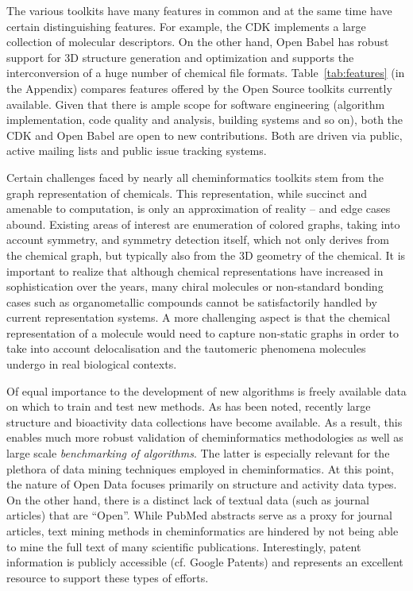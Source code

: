 \documentclass{sig-alternate}
\begin{document}
The various toolkits have many features in common and at the same time
have certain distinguishing features. For example, the CDK implements
a large collection of molecular descriptors. On the other hand, Open
Babel has robust support for 3D structure generation and optimization
and supports the interconversion of a huge number of chemical file
formats. Table~\ref{tab:features} (in the Appendix) compares features
offered by the Open Source toolkits currently available.  Given that
there is ample scope for software engineering (algorithm
implementation, code quality and analysis, building systems and so on), both
the CDK and Open Babel are open to new contributions. Both are driven
via public, active mailing lists and public issue tracking systems.

Certain challenges faced by nearly all cheminformatics toolkits stem
from the graph representation of chemicals. This representation, while
succinct and amenable to computation, is only an approximation of
reality -- and edge cases abound. Existing areas of interest are
enumeration of colored graphs, taking into account symmetry, and
symmetry detection itself, which not only derives from the chemical
graph, but typically also from the 3D geometry of the chemical. It is
important to realize that although chemical representations have
increased in sophistication over the years, many chiral molecules or
non-standard bonding cases such as organometallic compounds cannot be
satisfactorily handled by current representation systems. A more
challenging aspect is that the chemical representation of a molecule
would need to capture non-static graphs in order to take into
account delocalisation and the tautomeric phenomena molecules undergo
in real biological contexts.

Of equal importance to the development of new algorithms is freely
available data on which to train and test new methods. As has been
noted, recently large structure and bioactivity data collections have
become available. As a result, this enables much more robust
validation of cheminformatics methodologies as well as large scale
\emph{benchmarking of algorithms}. The latter is especially relevant
for the plethora of data mining techniques employed in
cheminformatics. At this point, the nature of Open Data focuses
primarily on structure and activity data types. On the other hand,
there is a distinct lack of textual data (such as journal articles)
that are ``Open''. While PubMed abstracts serve as a proxy
for journal articles, text mining methods in cheminformatics are
hindered by not being able to mine the full text of many scientific
publications.  Interestingly, patent information is publicly
accessible (cf. Google Patents) and represents an excellent resource
to support these types of efforts.
\end{document}
